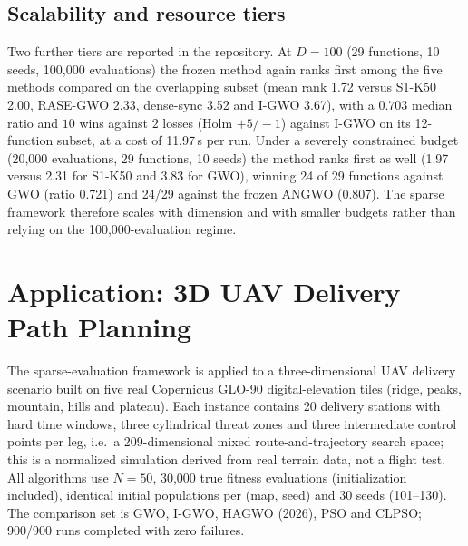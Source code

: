 \documentclass[journal]{IEEEtran}
\begin{document}
\begin{table}[t]
\centering
\small
\caption{Behaviour metrics on the formal tier (probe-instrumented
methods).}
\label{tab:behaviour}
\resizebox{\columnwidth}{!}{}
\end{table}

\subsection{Scalability and resource tiers}
Two further tiers are reported in the repository. At $D=100$ (29 functions,
10 seeds, 100{,}000 evaluations) the frozen method again ranks first among
the five methods compared on the overlapping subset (mean rank 1.72 versus
S1-K50 2.00, RASE-GWO 2.33, dense-sync 3.52 and I-GWO 3.67), with a
$0.703$ median ratio and $10$ wins against $2$ losses (Holm $+5/-1$) against
I-GWO on its 12-function subset, at a cost of 11.97\,s per run. Under a
severely constrained budget (20{,}000 evaluations, 29 functions, 10 seeds)
the method ranks first as well (1.97 versus 2.31 for S1-K50 and 3.83 for
GWO), winning 24 of 29 functions against GWO (ratio 0.721) and 24/29
against the frozen ANGWO (0.807). The sparse framework therefore scales
with dimension and with smaller budgets rather than relying on the
100{,}000-evaluation regime.


\section{Application: 3D UAV Delivery Path Planning}
\label{sec:uav}
The sparse-evaluation framework is applied to a three-dimensional UAV delivery
scenario built on five real Copernicus GLO-90 digital-elevation tiles (ridge,
peaks, mountain, hills and plateau). Each instance contains 20 delivery
stations with hard time windows, three cylindrical threat zones and three
intermediate control points per leg, i.e.\ a 209-dimensional mixed
route-and-trajectory search space; this is a normalized simulation derived from
real terrain data, not a flight test. All algorithms use $N=50$, 30{,}000 true
fitness evaluations (initialization included), identical initial populations
per (map, seed) and 30 seeds (101--130). The comparison set is GWO, I-GWO,
HAGWO (2026), PSO and CLPSO; 900/900 runs completed with zero failures.
\end{document}
